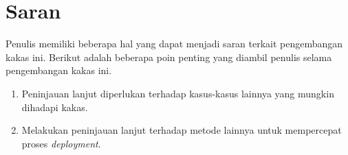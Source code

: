\section{Saran}

Penulis memiliki beberapa hal yang dapat menjadi saran terkait pengembangan kakas ini.
Berikut adalah beberapa poin penting yang diambil penulis selama pengembangan kakas ini.

\begin{enumerate}
    \item Peninjauan lanjut diperlukan terhadap kasus-kasus lainnya yang mungkin dihadapi kakas.
    \item Melakukan peninjauan lanjut terhadap metode lainnya untuk mempercepat proses \textit{deployment}.
\end{enumerate}